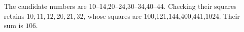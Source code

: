 The candidate numbers are 10--14,20--24,30--34,40--44. Checking their squares retains $10,11,12,20,21,32$, whose squares are 100,121,144,400,441,1024. Their sum is $\boxed{106}$.
